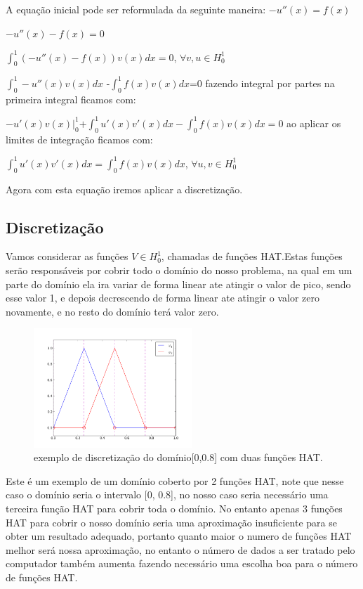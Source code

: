 \documentclass[a4paper]{article}
\begin{document}
A equação inicial pode ser reformulada da seguinte maneira: \(-u''(x)=f(x)\) 

\(-u''(x)-f(x)=0\)

\(\int_{0}^{1}(-u''(x)-f(x))v(x)dx=0\),  \(\forall v,u\in H_{0}^{1} \)

\(\int_{0}^{1}-u''(x)v(x)dx\) -\(\int_{0}^{1}f(x)v(x)dx\)=0 fazendo integral por partes na primeira integral ficamos com:

\(-u'(x)v(x)|_{0}^{1}\)\(+\int_{0}^{1}u'(x)v'(x)dx-\int_{0}^{1}f(x)v(x)dx=0\) ao aplicar os limites de integração ficamos com:

\(\int_{0}^{1}u'(x)v'(x)dx=\int_{0}^{1}f(x)v(x)dx\),   \(\forall u,v\in H_{0}^{1} \)

Agora com esta equação iremos aplicar a discretização.

\subsection{Discretização}

Vamos considerar as funções \(V \in H_{0}^{1} \), chamadas de funções HAT.Estas funções serão responsáveis por cobrir todo o domínio do nosso problema, na qual em um parte do domínio  ela ira variar de forma linear ate atingir o valor de pico, sendo esse valor 1, e depois decrescendo de forma linear ate atingir o valor zero novamente, e no resto do domínio terá valor zero.

\clearpage

\begin{figure}
\centering
\includegraphics[width=0.53\textwidth]{hat_functions.png}

\caption{exemplo de discretização do domínio[0,0.8] com duas funções HAT.}
\end{figure}



 Este é um exemplo de um domínio coberto por 2 funções HAT, note que nesse caso o domínio seria o intervalo [0, 0.8], no nosso caso seria necessário uma terceira função HAT para cobrir toda o domínio. No entanto apenas 3 funções HAT para cobrir o nosso domínio seria uma aproximação insuficiente para se obter um resultado adequado, portanto quanto maior o numero de funções HAT melhor será nossa aproximação, no entanto o número de dados a ser tratado pelo computador também aumenta fazendo necessário uma escolha boa para o número de funções HAT.
 
\end{document}

